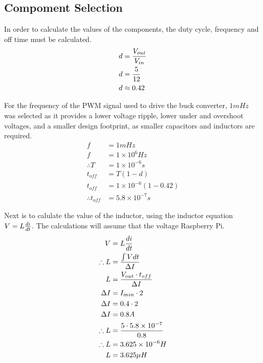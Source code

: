 \subsection{Compoment Selection}
In order to calculate the values of the components, the duty cycle, frequency and off time must be calculated.
\begin{align}
    d &= {V_{out} \over V_{in}} \\
    d &= {5 \over 12} \\
    d &\approx 0.42
\end{align}

For the frequency of the PWM signal used to drive the buck converter, $1mHz$ was selected as it provides a lower voltage ripple, lower under and overshoot voltages, and a smaller design footprint, as smaller capacitors and inductors are required.
\begin{align}
    f &= 1mHz \\
    f &= 1 \times 10^{6} Hz \\
    \therefore T &= 1 \times 10^{-6} s \\
    t_{off} &= T(1-d) \\
    t_{off} &= 1 \times 10^{-6} (1 - 0.42) \\
    \therefore t_{off} &= 5.8 \times 10^{-7} s
\end{align}

Next is to calulate the value of the inductor, using the inductor equation $V = {L {{di} \over {dt}}}$. The calculations will assume that the voltage Raspberry Pi.
\begin{align}
    V &= {{L} {{di} \over {dt}}} \\
    \therefore L &= {{\int V dt} \over {\Delta I}} \\
    L &= {{V_{out} \cdot t_{off}} \over {\Delta I}} \\
    \Delta I &= I_{min} \cdot 2 \\
    \Delta I &= 0.4 \cdot 2 \\
    \Delta I &= 0.8A \\
    \therefore L &= {{5 \cdot 5.8 \times 10^{-7}} \over {0.8}} \\
    \therefore L &= 3.625 \times 10^{-6} H \\
    L &= 3.625 \mu H
\end{align}

